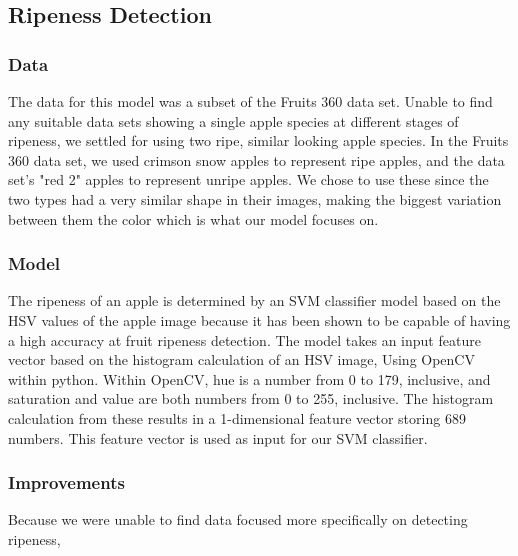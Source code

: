 \subsection{Ripeness Detection}
\subsubsection{Data}
The data for this model was a subset of the Fruits 360 data set. %
Unable to find any suitable data sets showing a single apple species at different stages of ripeness, we settled for using two ripe, similar looking apple species.
In the Fruits 360 data set, we used crimson snow apples to represent ripe apples, and the data set's "red 2" apples to represent unripe apples. We  chose to use these since the two types had a very similar shape in their images, making the biggest variation between them the color which is what our model focuses on.

\subsubsection{Model}
The ripeness of an apple is determined by an SVM classifier model based on the HSV values of the apple image because it has been shown to be capable of having a high accuracy at fruit ripeness detection\cite{HSVRipeness}.
The model takes an input feature vector based on the histogram calculation of an HSV image, Using OpenCV within python.
Within OpenCV, hue is a number from 0 to 179, inclusive, and saturation and value are both numbers from 0 to 255, inclusive.
The histogram calculation from these results in a 1-dimensional feature vector storing 689 numbers. 
This feature vector is used as input for our SVM classifier.

\subsubsection{Improvements}
Because we were unable to find data focused more specifically on detecting ripeness,



